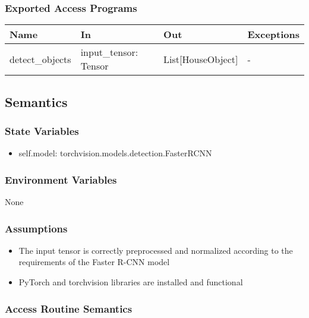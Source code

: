 \documentclass[12pt, titlepage]{article}
\begin{document}
\subsubsection{Exported Access Programs}

\begin{center}
\begin{tabular}{p{5cm} p{3cm} p{3cm} p{2cm}}
\hline
\textbf{Name} & \textbf{In} & \textbf{Out} & \textbf{Exceptions} \\
\hline
detect{\_}objects & input{\_}tensor: Tensor & List[HouseObject] & - \\
\hline
\end{tabular}
\end{center}

\subsection{Semantics}

\subsubsection{State Variables}
\begin{itemize}
	\item self.model: torchvision.models.detection.FasterRCNN
\end{itemize}


\subsubsection{Environment Variables}
None

\subsubsection{Assumptions}
\begin{itemize}
  \item The input tensor is correctly preprocessed and normalized according to the requirements of the Faster R-CNN model
  \item PyTorch and torchvision libraries are installed and functional
\end{itemize}


\subsubsection{Access Routine Semantics}
\end{document}
